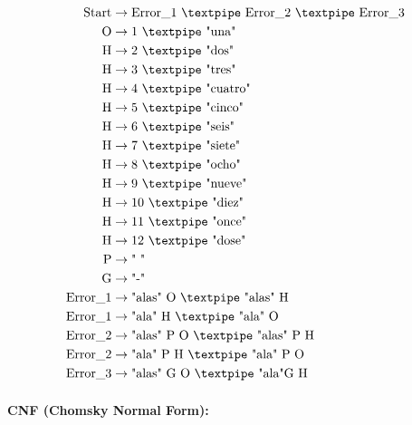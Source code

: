 \begin{equation*}
    \begin{aligned}
        \text{Start}   & \rightarrow \text{Error\_1 {\textpipe} Error\_2 {\textpipe} Error\_3}   \\
        \text{O} & \rightarrow \text{1 {\textpipe} "una"}   \\
        \text{H} & \rightarrow \text{2 {\textpipe} "dos"} \\
        \text{H} & \rightarrow \text{3 {\textpipe} "tres"} \\
        \text{H} & \rightarrow \text{4 {\textpipe} "cuatro"} \\
        \text{H} & \rightarrow \text{5 {\textpipe} "cinco"} \\
        \text{H} & \rightarrow \text{6 {\textpipe} "seis"} \\
        \text{H} & \rightarrow \text{7 {\textpipe} "siete"} \\
        \text{H} & \rightarrow \text{8 {\textpipe} "ocho"} \\
        \text{H} & \rightarrow \text{9 {\textpipe} "nueve"} \\
        \text{H} & \rightarrow \text{10 {\textpipe} "diez"} \\
        \text{H} & \rightarrow \text{11 {\textpipe} "once"} \\
        \text{H} & \rightarrow \text{12 {\textpipe} "dose"} \\
        \text{P} & \rightarrow \text{" "} \\
        \text{G} & \rightarrow \text{"-"} \\
        \text{Error\_1}   & \rightarrow \text{"alas" O {\textpipe} "alas" H}   \\
        \text{Error\_1}   & \rightarrow \text{"ala" H {\textpipe} "ala" O}   \\
        \text{Error\_2}   & \rightarrow \text{"alas" P O {\textpipe} "alas" P H}   \\
        \text{Error\_2}   & \rightarrow \text{"ala" P H {\textpipe} "ala" P O }   \\
        \text{Error\_3}   & \rightarrow \text{"alas" G O {\textpipe} "ala"G H}
    \end{aligned}
\end{equation*}

\paragraph{CNF (Chomsky Normal Form):}

